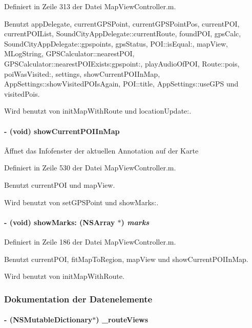 Definiert in Zeile 313 der Datei MapViewController.m.

Benutzt appDelegate, currentGPSPoint, currentGPSPointPos, currentPOI, currentPOIList, SoundCityAppDelegate::currentRoute, foundPOI, gpsCalc, SoundCityAppDelegate::gpspoints, gpsStatus, POI::isEqual:, mapView, MLogString, GPSCalculator::nearestPOI, GPSCalculator::nearestPOIExists:gpspoint:, playAudioOfPOI, Route::pois, poiWasVisited:, settings, showCurrentPOIInMap, AppSettings::showVisitedPOIsAgain, POI::title, AppSettings::useGPS und visitedPois.

Wird benutzt von initMapWithRoute und locationUpdate:.\hypertarget{interface_map_view_controller_a41ee7e4c7e55bce32dccb93d128dc988}{
\paragraph[{showCurrentPOIInMap}]{\setlength{\rightskip}{0pt plus 5cm}-\/ (void) showCurrentPOIInMap }\hfill}
\label{interface_map_view_controller_a41ee7e4c7e55bce32dccb93d128dc988}
Ãffnet das Infofenster der aktuellen Annotation auf der Karte 

Definiert in Zeile 530 der Datei MapViewController.m.

Benutzt currentPOI und mapView.

Wird benutzt von setGPSPoint und showMarks:.\hypertarget{interface_map_view_controller_a4c6506cd8c42f8da285f1c3a153a2d14}{
\paragraph[{showMarks:}]{\setlength{\rightskip}{0pt plus 5cm}-\/ (void) showMarks: (NSArray $\ast$) {\em marks}}\hfill}
\label{interface_map_view_controller_a4c6506cd8c42f8da285f1c3a153a2d14}


Definiert in Zeile 186 der Datei MapViewController.m.

Benutzt currentPOI, fitMapToRegion, mapView und showCurrentPOIInMap.

Wird benutzt von initMapWithRoute.

\subsubsection{Dokumentation der Datenelemente}
\hypertarget{interface_map_view_controller_a9ea754eff3429ea0a98887f0bcb43eb8}{
\paragraph[{\_\-routeViews}]{\setlength{\rightskip}{0pt plus 5cm}-\/ (NSMutableDictionary$\ast$) {\bf \_\-routeViews}}\hfill}
\label{interface_map_view_controller_a9ea754eff3429ea0a98887f0bcb43eb8}



